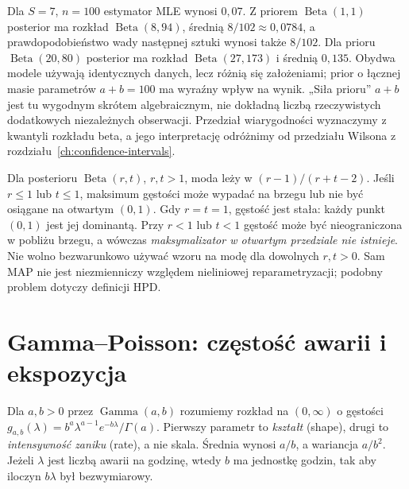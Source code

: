 \begin{przyklad}
Dla $S=7$, $n=100$ estymator MLE wynosi $0{,}07$.
Z priorem $\operatorname{Beta}(1,1)$ posterior ma rozkład
$\operatorname{Beta}(8,94)$, średnią $8/102\approx0{,}0784$,
a prawdopodobieństwo wady następnej sztuki wynosi także $8/102$.
Dla prioru $\operatorname{Beta}(20,80)$ posterior ma rozkład
$\operatorname{Beta}(27,173)$ i średnią $0{,}135$.
Obydwa modele używają identycznych danych, lecz różnią się
założeniami; prior o łącznej masie parametrów $a+b=100$
ma wyraźny wpływ na wynik. „Siła prioru” $a+b$ jest tu
wygodnym skrótem algebraicznym, nie dokładną liczbą
rzeczywistych dodatkowych niezależnych obserwacji.
Przedział wiarygodności wyznaczymy z kwantyli rozkładu beta,
a jego interpretację odróżnimy od przedziału Wilsona z
rozdziału~\ref{ch:confidence-intervals}.
\end{przyklad}

\begin{uwaga}
Dla posterioru $\operatorname{Beta}(r,t)$, $r,t>1$,
moda leży w $(r-1)/(r+t-2)$. Jeśli $r\le1$ lub $t\le1$,
maksimum gęstości może wypadać na brzegu lub nie być osiągane
na otwartym $(0,1)$. Gdy $r=t=1$, gęstość jest stała:
każdy punkt $(0,1)$ jest jej dominantą. Przy $r<1$ lub
$t<1$ gęstość może być nieograniczona w pobliżu brzegu,
a wówczas \emph{maksymalizator w otwartym przedziale nie istnieje}.
Nie wolno bezwarunkowo używać wzoru na modę dla dowolnych
$r,t>0$. Sam MAP nie jest niezmienniczy względem nieliniowej
reparametryzacji; podobny problem dotyczy definicji HPD.
\end{uwaga}

\section{Gamma--Poisson: częstość awarii i ekspozycja}
\begin{definicja}
Dla $a,b>0$ przez $\operatorname{Gamma}(a,b)$ rozumiemy
rozkład na $(0,\infty)$ o gęstości
$g_{a,b}(\lambda)=b^a\lambda^{a-1}e^{-b\lambda}/\Gamma(a)$.
Pierwszy parametr to \emph{kształt} (shape), drugi to
\emph{intensywność zaniku} (rate), a nie skala.
Średnia wynosi $a/b$, a wariancja $a/b^2$.
Jeżeli $\lambda$ jest liczbą awarii na godzinę, wtedy
$b$ ma jednostkę godzin, tak aby iloczyn $b\lambda$
był bezwymiarowy.
\end{definicja}


